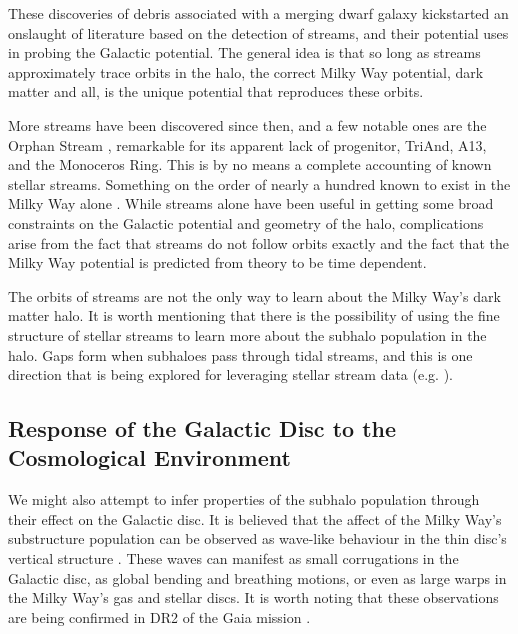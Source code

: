 These discoveries of debris associated with a merging dwarf galaxy kickstarted an onslaught of literature based on the detection of streams, and their potential uses in probing the Galactic potential. The general idea is that so long as streams approximately trace orbits in the halo, the correct Milky Way potential, dark matter and all, is the unique potential that reproduces these orbits. 

More streams have been discovered since then, and a few notable ones are the Orphan Stream \citep{grillmair_2006,belokurov_2007,newberg_2010}, remarkable for its apparent lack of progenitor, TriAnd, A13, and the Monoceros Ring. This is by no means a complete accounting of known stellar streams. Something on the order of nearly a hundred known to exist in the Milky Way alone \citep{sanders_binney_2013_a, ibata_2019}. While streams alone have been useful in getting some broad constraints on the Galactic potential and geometry of the halo, complications arise from the fact that streams do not follow orbits exactly \citep{sanders_binney_2013_a} and the fact that the Milky Way potential is predicted from theory to be time dependent.

The orbits of streams are not the only way to learn about the Milky Way's dark matter halo. It is worth mentioning that there is the possibility of using the fine structure of stellar streams to learn more about the subhalo population in the halo.  Gaps form when subhaloes pass through tidal streams, and this is one direction that is being explored for leveraging stellar stream data (e.g. \citet{erkal_2016_stream_gaps}).

\subsection{Response of the Galactic Disc to the Cosmological Environment}


We might also attempt to infer properties of the subhalo population through their effect on the Galactic disc.  It is believed that the affect of the Milky Way's substructure population can be observed as wave-like behaviour in the thin disc's vertical structure \citep{widrow_2012_sdss,carlin_2013_lamost, williams_2013_rave,xu_2015, carrillo_2018_rave}.  These waves can manifest as small corrugations in the Galactic disc, as global bending and breathing motions, or even as large warps in the Milky Way's gas  \citep{gasWarp} and stellar discs. It is worth noting that these observations are being confirmed in DR2 of the Gaia mission \citep[for example]{gaia_collab,bennet_2019_gaia}.

